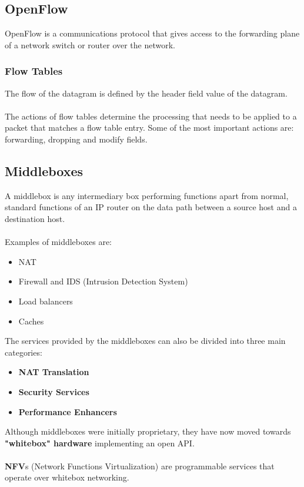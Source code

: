 \documentclass{article}
\begin{document}
\subsection{OpenFlow}
OpenFlow is a communications protocol that gives access to the forwarding plane of a network switch or router over the network.

\subsubsection{Flow Tables}
The flow of the datagram is defined by the header field value of the datagram. \\ \\
The actions of flow tables determine the processing that needs to be applied to a packet that matches a flow table entry. Some of the most important actions are: forwarding, dropping and modify fields.

\subsection{Middleboxes}
A middlebox is any intermediary box performing functions apart from normal, standard functions of an IP router on the data path between a source host and a destination host. \\ \\
Examples of middleboxes are:

\begin{itemize}
	\item NAT
	\item Firewall and IDS (Intrusion Detection System)
	\item Load balancers
	\item Caches
\end{itemize}
The services provided by the middleboxes can also be divided into three main categories:

\begin{itemize}
	\item \textbf{NAT Translation}
	\item \textbf{Security Services}
	\item \textbf{Performance Enhancers}
\end{itemize}
Although middleboxes were initially proprietary, they have now moved towards \textbf{"whitebox" hardware} implementing an open API. \\ \\
\textbf{NFV}s (Network Functions Virtualization) are programmable services that operate over whitebox networking.
\end{document}
